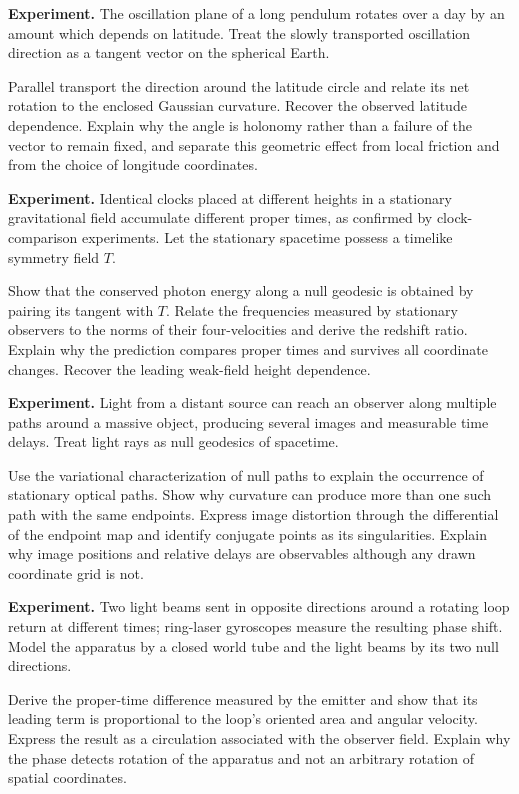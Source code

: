 \begin{exercise}
\textbf{Experiment.}
The oscillation plane of a long pendulum rotates over a day by an amount which
depends on latitude.  Treat the slowly transported oscillation direction as a
tangent vector on the spherical Earth.

Parallel transport the direction around the latitude circle and relate its
net rotation to the enclosed Gaussian curvature.  Recover the observed
latitude dependence.  Explain why the angle is holonomy rather than a failure
of the vector to remain fixed, and separate this geometric effect from local
friction and from the choice of longitude coordinates.
\end{exercise}

\begin{exercise}
\textbf{Experiment.}
Identical clocks placed at different heights in a stationary gravitational
field accumulate different proper times, as confirmed by clock-comparison
experiments.  Let the stationary spacetime possess a timelike symmetry field
\(T\).

Show that the conserved photon energy along a null geodesic is obtained by
pairing its tangent with \(T\).  Relate the frequencies measured by stationary
observers to the norms of their four-velocities and derive the redshift ratio.
Explain why the prediction compares proper times and survives all coordinate
changes.  Recover the leading weak-field height dependence.
\end{exercise}

\begin{exercise}
\textbf{Experiment.}
Light from a distant source can reach an observer along multiple paths around
a massive object, producing several images and measurable time delays.
Treat light rays as null geodesics of spacetime.

Use the variational characterization of null paths to explain the occurrence
of stationary optical paths.  Show why curvature can produce more than one
such path with the same endpoints.  Express image distortion through the
differential of the endpoint map and identify conjugate points as its
singularities.  Explain why image positions and relative delays are
observables although any drawn coordinate grid is not.
\end{exercise}

\begin{exercise}
\textbf{Experiment.}
Two light beams sent in opposite directions around a rotating loop return at
different times; ring-laser gyroscopes measure the resulting phase shift.
Model the apparatus by a closed world tube and the light beams by its two null
directions.

Derive the proper-time difference measured by the emitter and show that its
leading term is proportional to the loop's oriented area and angular
velocity.  Express the result as a circulation associated with the observer
field.  Explain why the phase detects rotation of the apparatus and not an
arbitrary rotation of spatial coordinates.
\end{exercise}

